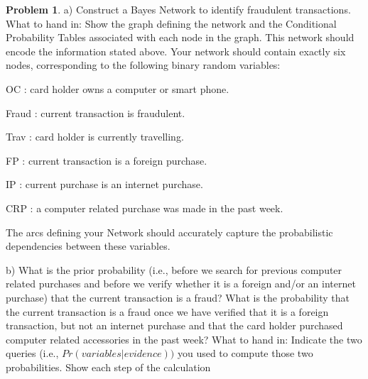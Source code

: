 \documentclass{article}
\theoremstyle{definition}
\newtheorem{problem}{Problem}
\begin{document}
\begin{problem}
    \item a) Construct a Bayes Network to identify fraudulent transactions.
What to hand in: Show the graph defining the network and the Conditional Probability Tables associated with each node in the graph. This network should encode the information stated above. Your network should contain exactly six nodes, corresponding to the following binary random variables: 
    \item OC : card holder owns a computer or smart phone.
    \item Fraud : current transaction is fraudulent.
    \item Trav : card holder is currently travelling.
    \item FP : current transaction is a foreign purchase.
    \item IP : current purchase is an internet purchase.
    \item CRP : a computer related purchase was made in the past week.
    \item The arcs defining your Network should accurately capture the probabilistic dependencies between these variables.
    \item b) What is the prior probability (i.e., before we search for previous computer related purchases and before we verify whether it is a foreign and/or an internet purchase) that the current transaction is a fraud? What is the probability that the current transaction is a fraud once we have verified that it is a foreign transaction, but not an internet purchase and that the card holder purchased computer related accessories in the past week? What to hand in: Indicate the two queries (i.e., $Pr(variables|evidence))$ you used to compute those two probabilities. Show each step of the calculation
\end{problem}
\end{document}
